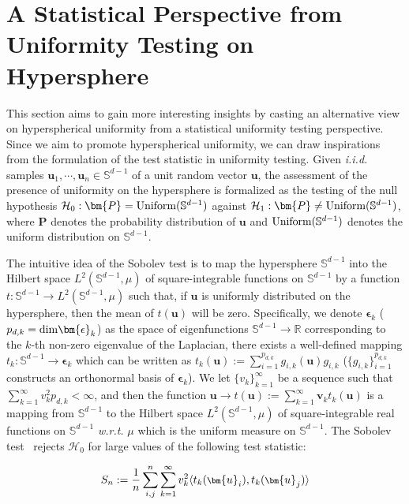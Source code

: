 \section{A Statistical Perspective from Uniformity Testing on Hypersphere}

This section aims to gain more interesting insights by casting an alternative view on hyperspherical uniformity from a statistical uniformity testing perspective. Since we aim to promote hyperspherical uniformity, we can draw inspirations from the formulation of the test statistic in uniformity testing. Given \emph{i.i.d.} samples $\bm{u}_1,\cdots,\bm{u}_n\in\mathbb{S}^{d-1}$ of a unit random vector $\bm{u}$, the assessment of the presence of uniformity on the hypersphere is formalized as the testing of the null hypothesis $\mathcal{H}_0:\bm{P}=\textnormal{Uniform}(\mathbb{S}^{d-1})$ against $\mathcal{H}_1:\bm{P}\neq\textnormal{Uniform}(\mathbb{S}^{d-1})$, where $\bm{P}$ denotes the probability distribution of $\bm{u}$ and $\textnormal{Uniform}(\mathbb{S}^{d-1})$ denotes the uniform distribution on $\mathbb{S}^{d-1}$. 
\par
The intuitive idea of the Sobolev test is to map the hypersphere $\mathbb{S}^{d-1}$ into the Hilbert space $L^2(\mathbb{S}^{d-1},\mu)$ of square-integrable functions on $\mathbb{S}^{d-1}$ by a function $t:\mathbb{S}^{d-1}\rightarrow L^2(\mathbb{S}^{d-1},\mu)$ such that, if $\bm{u}$ is uniformly distributed on the hypersphere, then the mean of $t(\bm{u})$ will be zero. Specifically, we denote $\bm{\epsilon}_k$ ($p_{d,k}=\textnormal{dim}\bm{\epsilon}_k$) as the space of eigenfunctions $\mathbb{S}^{d-1}\rightarrow\mathbb{R}$ corresponding to the $k$-th non-zero eigenvalue of the Laplacian, there exists a well-defined mapping $t_k:\mathbb{S}^{d-1}\rightarrow\bm{\epsilon}_k$ which can be written as $t_k(\bm{u}):=\sum_{i=1}^{p_{d,k}}g_{i,k}(\bm{u})g_{i,k}$ ($\{g_{i,k}\}_{i=1}^{p_{d,k}}$ constructs an orthonormal basis of $\bm{\epsilon}_k$). We let $\{v_k\}_{k=1}^\infty$ be a sequence such that $\sum_{k=1}^\infty v_k^2 p_{d,k}<\infty$, and then the function $\bm{u}\rightarrow t(\bm{u}):=\sum_{k=1}^\infty\bm{v}_k t_k(\bm{u})$ is a mapping from $\mathbb{S}^{d-1}$ to the Hilbert space $L^2(\mathbb{S}^{d-1},\mu)$ of square-integrable real functions on $\mathbb{S}^{d-1}$ \emph{w.r.t.} $\mu$ which is the uniform measure on $\mathbb{S}^{d-1}$. The Sobolev test~\cite{beran1968testing,gine1975invariant} rejects $\mathcal{H}_0$ for large values of the following test statistic:

\begin{equation}
\footnotesize
    S_n:=\frac{1}{n}\sum_{i,j}^n\sum_{k=1}^\infty v_k^2\langle t_k(\bm{u}_i),t_k(\bm{u}_j)\rangle
\end{equation}

